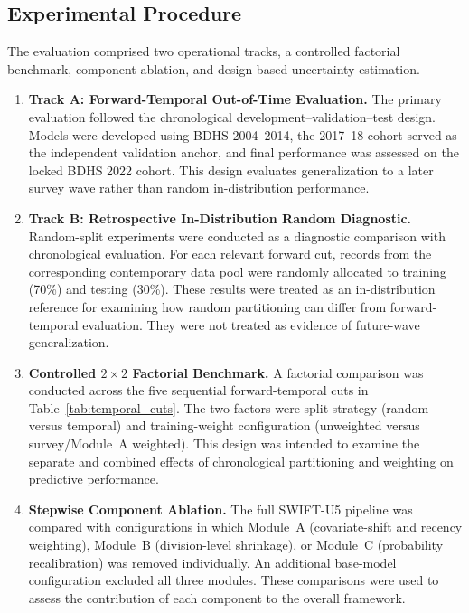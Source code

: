 \documentclass[a4paper,fleqn]{cas-sc}
\begin{document}
\subsection{Experimental Procedure}
\label{sec:exp_procedure}

The evaluation comprised two operational tracks, a controlled factorial benchmark, component ablation, and design-based uncertainty estimation.

\begin{enumerate}
    \item \textbf{Track A: Forward-Temporal Out-of-Time Evaluation.}
    The primary evaluation followed the chronological development--validation--test design. Models were developed using BDHS 2004--2014, the 2017--18 cohort served as the independent validation anchor, and final performance was assessed on the locked BDHS 2022 cohort. This design evaluates generalization to a later survey wave rather than random in-distribution performance.

    \item \textbf{Track B: Retrospective In-Distribution Random Diagnostic.}
    Random-split experiments were conducted as a diagnostic comparison with chronological evaluation. For each relevant forward cut, records from the corresponding contemporary data pool were randomly allocated to training (70\%) and testing (30\%). These results were treated as an in-distribution reference for examining how random partitioning can differ from forward-temporal evaluation. They were not treated as evidence of future-wave generalization.

    \item \textbf{Controlled $2\times2$ Factorial Benchmark.}
    A factorial comparison was conducted across the five sequential forward-temporal cuts in Table~\ref{tab:temporal_cuts}. The two factors were split strategy (random versus temporal) and training-weight configuration (unweighted versus survey/Module~A weighted). This design was intended to examine the separate and combined effects of chronological partitioning and weighting on predictive performance.

    \item \textbf{Stepwise Component Ablation.}
    The full SWIFT-U5 pipeline was compared with configurations in which Module~A (covariate-shift and recency weighting), Module~B (division-level shrinkage), or Module~C (probability recalibration) was removed individually. An additional base-model configuration excluded all three modules. These comparisons were used to assess the contribution of each component to the overall framework.


\end{enumerate}
\end{document}
